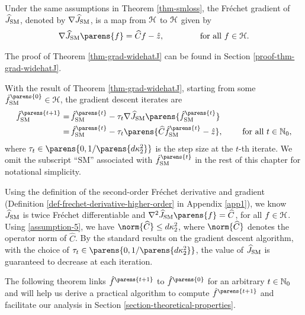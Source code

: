 \begin{theorem}\label{thm-grad-widehatJ}
	Under the same assumptions in Theorem \ref{thm-smloss}, the Fr{\'e}chet gradient of $\widehat{J}_{\mathrm{SM}}$, denoted by $\nabla \widehat{J}_{\mathrm{SM}}$, is a map from $\mathcal{H}$ to $\mathcal{H}$ given by 
	\begin{align*}
		\nabla \widehat{J}_{\SM} \parens{f} = \widehat{C} f - \hat{z}, \qquad \qquad \text{ for all } f \in \calH. 
	\end{align*}
\end{theorem}

The proof of Theorem \ref{thm-grad-widehatJ} can be found in Section \ref{proof-thm-grad-widehatJ}. 

With the result of Theorem \ref{thm-grad-widehatJ}, starting from some $\hat{f}_{\SM}^{\parens{0}} \in \calH$, the gradient descent iterates are 
\begin{align}
	\hat{f}_{\SM}^{\parens{t+1}} = & \, \hat{f}_{\SM}^{\parens{t}} - \tau_{t} \nabla \widehat{J}_{\SM} \parens{\hat{f}_{\SM}^{\parens{t}}} \nonumber \\ 
	= & \, \hat{f}_{\SM}^{\parens{t}} - \tau_{t} \parens{\widehat{C} \hat{f}_{\SM}^{\parens{t}} - \hat{z}}, \qquad \text{ for all } t \in \Natural_0, \label{eq-grad-updates}
\end{align}
where $\tau_t \in \parens{0, 1 / \parens{d \kappa_2^2} }$ is the step size at the $t$-th iterate. We omit the subscript ``SM'' associated with $\hat{f}_{\SM}^{\parens{t}}$ in the rest of this chapter for notational simplicity. 

Using the definition of the second-order Fr{\'e}chet derivative and gradient (Definition \ref{def-frechet-derivative-higher-order} in Appendix \ref{app1}), we know $\widehat{J}_{\mathrm{SM}}$ is twice Fr{\'e}chet differentiable and $\nabla^2 \widehat{J}_{\SM} \parens{f} = \widehat{C}$, for all $f \in \mathcal{H}$. Using \ref{assumption-5}, we have $\norm{\widehat{C}} \le d \kappa_2^2$, where $\norm{\widehat{C}}$ denotes the operator norm of $\widehat{C}$. By the standard results on the gradient descent algorithm, with the choice of $\tau_t \in \parens{0, 1 / \parens{d \kappa_2^2} }$, the value of $\widehat{J}_{\mathrm{SM}}$ is guaranteed to decrease at each iteration. 

The following theorem links $\hat{f}^{\parens{t+1}}$ to $\hat{f}^{\parens{0}}$ for an arbitrary $t \in \mathbb{N}_0$ and will help us derive a practical algorithm to compute $\hat{f}^{\parens{t+1}}$ and facilitate our analysis in Section \ref{section-theoretical-properties}. 

